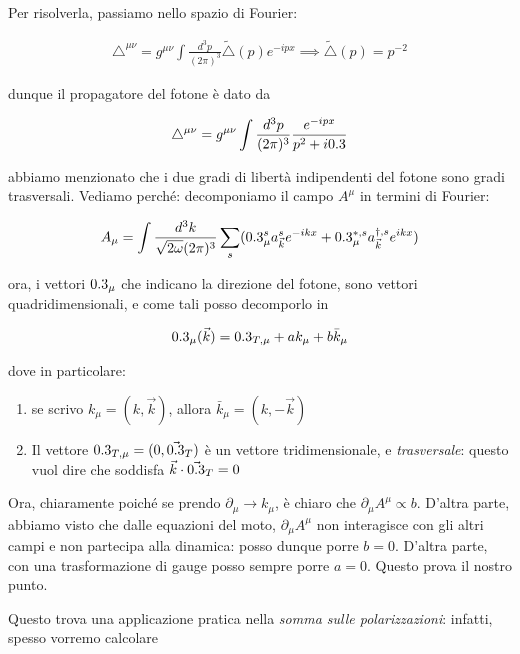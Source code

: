 \documentclass[11pt]{report}
\begin{document}
Per risolverla, passiamo nello spazio di Fourier: 

\begin{align}
    \triangle^{\mu\nu} = g^{\mu\nu}\int \frac{d^3 p}{(2\pi)^3}\tilde{\triangle}(p)e^{-ipx} \implies \tilde{\triangle}(p) = p^{-2}
\end{align}

dunque il propagatore del fotone è dato da 

\begin{align}
    \triangle^{\mu\nu} = g^{\mu\nu}\int \frac{d^3p}{(2\pi)^3}\frac{e^{-ipx}}{p^2 +i0.3}
\end{align}

abbiamo menzionato che i due gradi di libertà indipendenti del fotone sono gradi trasversali. Vediamo perché: decomponiamo il campo \(A^\mu\) in termini di Fourier: 

\begin{align}
    A_\mu = \int \frac{d^3k}{\sqrt{2\omega}(2\pi)^3}\sum_s (0.3_\mu^s a_{\vec{k}}^s e^{-ikx} + 0.3_\mu^{* , s}a_{\vec{k}}^{\dagger, s}e^{ikx})
\end{align}

ora, i vettori \(0.3_\mu\) che indicano la direzione del fotone, sono vettori quadridimensionali, e come tali posso decomporlo in  

\begin{align}
    0.3_\mu(\vec{k}) = 0.3_{T, \mu} + a k_{\mu} + b\bar{k}_\mu
\end{align}

dove in particolare: 

\begin{enumerate}
    \item se scrivo \(k_\mu = (k, \vec{k})\), allora \(\bar{k}_\mu = (k, -\vec{k})\)
    \item Il vettore \(0.3_{T, \mu} = (0, \vec{0.3}_T)\) è un vettore tridimensionale, e \emph{trasversale}: questo vuol dire che soddisfa \(\vec{k}\cdot \vec{0.3}_T = 0\)
\end{enumerate}

Ora, chiaramente poiché se prendo \(\partial_\mu \rightarrow k_\mu\), è chiaro che \(\partial_\mu A^\mu \propto b\). D'altra parte, abbiamo visto che dalle equazioni del moto, \(\partial_\mu A^\mu\) non interagisce con gli altri campi e non partecipa alla dinamica: posso dunque porre \(b=0\). D'altra parte, con una trasformazione di gauge posso sempre porre \(a=0\). Questo prova il nostro punto. 

Questo trova una applicazione pratica nella \emph{somma sulle polarizzazioni}: infatti, spesso vorremo calcolare 
\end{document}
